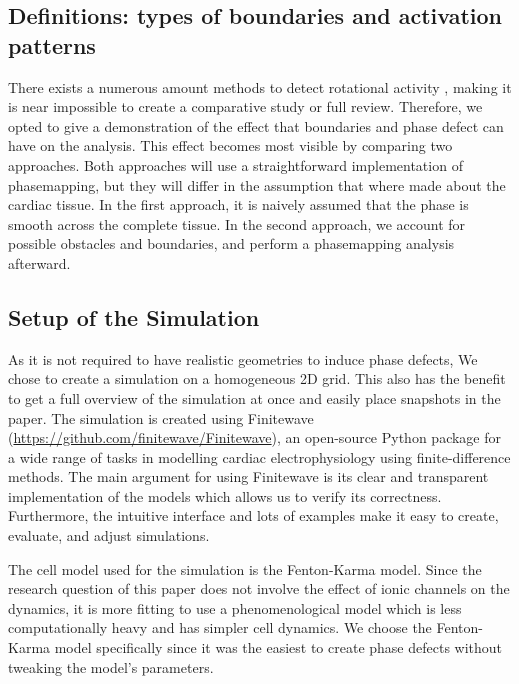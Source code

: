 \documentclass[twocolumn]{article}
\begin{document}
\subsection{Definitions: types of boundaries and activation patterns}


There exists a numerous amount methods to detect rotational activity \autocite{pikunov2023the, gurevich2019robust, li2020standardizing},
making it is near impossible to create a comparative study or full review.
Therefore, we opted to give a demonstration of the effect
that boundaries and phase defect can have on the analysis.
This effect becomes most visible by comparing two approaches.
Both approaches will use a straightforward implementation of phasemapping, but
they will differ in the assumption that where made about the cardiac tissue.
In the first approach, it is naively assumed
that the phase is smooth across the complete tissue.
In the second approach, we account for possible obstacles and boundaries,
and perform a phasemapping analysis afterward.

\subsection{Setup of the Simulation}

As it is not required to have realistic geometries to induce phase
defects, We chose to create a simulation on a homogeneous 2D grid. This
also has the benefit to get a full overview of the simulation at once
and easily place snapshots in the paper.
The simulation is created using Finitewave
(\url{https://github.com/finitewave/Finitewave}), an open-source Python
package for a wide range of tasks in modelling cardiac electrophysiology
using finite-difference methods. The main argument for using Finitewave
is its clear and transparent implementation of the models which allows
us to verify its correctness. Furthermore, the intuitive interface and
lots of examples make it easy to create, evaluate, and adjust
simulations.

The cell model used for the simulation is the Fenton-Karma model. Since
the research question of this paper does not involve the effect of ionic
channels on the dynamics, it is more fitting to use a phenomenological
model which is less computationally heavy and has simpler cell dynamics.
We choose the Fenton-Karma model specifically since it was the easiest
to create phase defects without tweaking the model's parameters.
\end{document}
